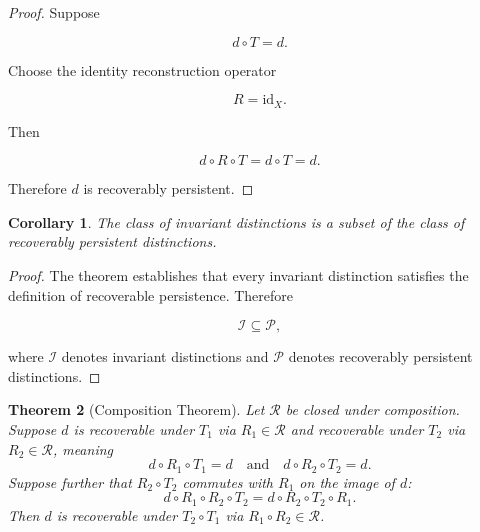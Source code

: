 \documentclass[12pt,oneside]{article}
\newtheorem{theorem}{Theorem}[section] \newtheorem{lemma}[theorem]{Lemma} \newtheorem{proposition}[theorem]{Proposition} \newtheorem{corollary}[theorem]{Corollary}
\theoremstyle{definition}
\begin{document}
\begin{proof}

Suppose

\[
d\circ T=d.
\]

Choose the identity reconstruction operator

\[
R=\mathrm{id}_X.
\]

Then

\[
d\circ R\circ T
=
d\circ T
=
d.
\]

Therefore \(d\) is recoverably persistent.

\end{proof}

\begin{corollary}

The class of invariant distinctions is a subset of the class of recoverably persistent distinctions.

\end{corollary}

\begin{proof}

The theorem establishes that every invariant distinction satisfies the definition of recoverable persistence. Therefore

\[
\mathcal I
\subseteq
\mathcal P,
\]

where \(\mathcal I\) denotes invariant distinctions and \(\mathcal P\) denotes recoverably persistent distinctions.

\end{proof}

\begin{theorem}[Composition Theorem]

Let \(\mathcal{R}\) be closed under composition.
Suppose \(d\) is recoverable under \(T_1\) via \(R_1 \in \mathcal{R}\) and recoverable under \(T_2\) via \(R_2 \in \mathcal{R}\),
meaning
\[
d \circ R_1 \circ T_1 = d
\quad\text{and}\quad
d \circ R_2 \circ T_2 = d.
\]
Suppose further that \(R_2 \circ T_2\) commutes with \(R_1\) on the image of \(d\):
\[
d \circ R_1 \circ R_2 \circ T_2 = d \circ R_2 \circ T_2 \circ R_1.
\]
Then \(d\) is recoverable under \(T_2 \circ T_1\) via \(R_1 \circ R_2 \in \mathcal{R}\).

\end{theorem}
\end{document}

